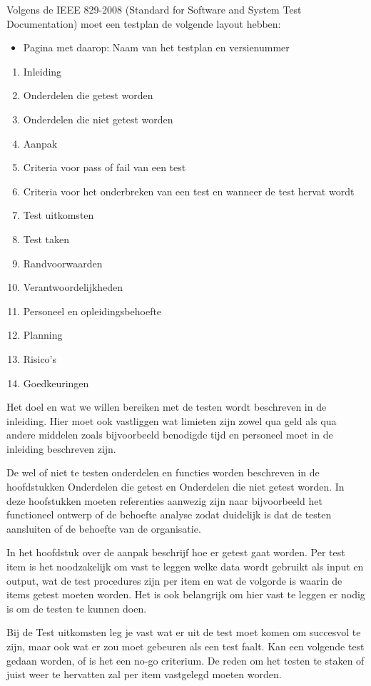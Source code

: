 
Volgens de IEEE 829-2008 (Standard for Software and System Test Documentation) moet een testplan de volgende layout hebben:
\begin{itemize}
\item Pagina met daarop: Naam van het testplan en versienummer
\end{itemize}
\begin{enumerate}
\item Inleiding
\item Onderdelen die getest worden
\item Onderdelen die niet getest worden
\item Aanpak
\item Criteria voor pass of fail van een test
\item Criteria voor het onderbreken van een test en wanneer de test hervat wordt
\item Test uitkomsten
\item Test taken
\item Randvoorwaarden
\item Verantwoordelijkheden
\item Personeel en opleidingsbehoefte
\item Planning
\item Risico's
\item Goedkeuringen
\end{enumerate}

Het doel en wat we willen bereiken met de testen wordt beschreven in de inleiding. Hier moet ook vastliggen wat limieten zijn zowel qua geld als qua andere middelen zoals bijvoorbeeld benodigde tijd en personeel moet in de inleiding beschreven zijn.

De wel of niet te testen onderdelen en functies worden beschreven in de hoofdstukken Onderdelen die getest en Onderdelen die niet getest worden. In deze hoofstukken moeten referenties aanwezig zijn naar bijvoorbeeld het functioneel ontwerp of de behoefte analyse zodat duidelijk is dat de testen aansluiten of de behoefte van de organisatie.

In het hoofdstuk over de aanpak beschrijf hoe er getest gaat worden. Per test item is het noodzakelijk om vast te leggen welke data wordt gebruikt als input en output, wat de test procedures zijn per item en wat de volgorde is waarin de items getest moeten worden. Het is ook belangrijk om hier vast te leggen er nodig is om de testen te kunnen doen.

Bij de Test uitkomsten leg je vast wat er uit de test moet komen om succesvol te zijn, maar ook wat er zou moet gebeuren als een test faalt. Kan een volgende test gedaan worden, of is het een no-go criterium. De reden om het testen te staken of juist weer te hervatten zal per item vastgelegd moeten worden.

